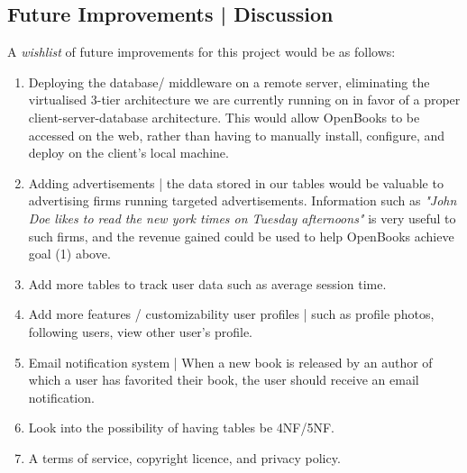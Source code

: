 \documentclass[letter, 12pt, titlepage]{article}
\begin{document}
\subsection{Future Improvements | Discussion}
A \textit{wishlist} of future improvements for this project would be as follows:
\begin{enumerate}
	\item Deploying the database/ middleware on a remote server, eliminating the virtualised 3-tier architecture we are currently running on in favor of a proper client-server-database architecture. This would allow OpenBooks to be accessed on the web, rather than having to manually install, configure, and deploy on the client's local machine.
	\item Adding advertisements | the data stored in our tables would be valuable to advertising firms running targeted advertisements. Information such as \textit{"John Doe likes to read the new york times on Tuesday afternoons"} is very useful to such firms, and the revenue gained could be used to help OpenBooks achieve  goal (1) above.
	\item Add more tables to track user data such as average session time.
	\item Add more features / customizability user profiles |  such as profile photos, following users, view other user's profile.
	\item Email notification system | When a new book is released by an author of which a user has favorited their book, the user should receive an email notification.
	\item Look into the possibility of having tables be 4NF/5NF.
	\item A terms of service, copyright licence, and privacy policy.
\end{enumerate}
\end{document}
